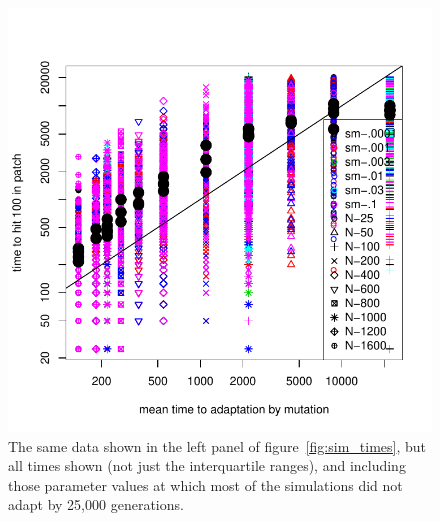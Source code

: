 \documentclass{article}
\begin{document}




\begin{figure}
  \begin{center}
    \includegraphics{mutation-times-predicted}
  \end{center}
  \caption{
    The same data shown in the left panel of figure~\ref{fig:sim_times},
    but all times shown (not just the interquartile ranges),
    and including those parameter values at which most of the simulations did not adapt by 25,000 generations.
  } \label{sfig:sim_migration_times}
\end{figure}
\end{document}
